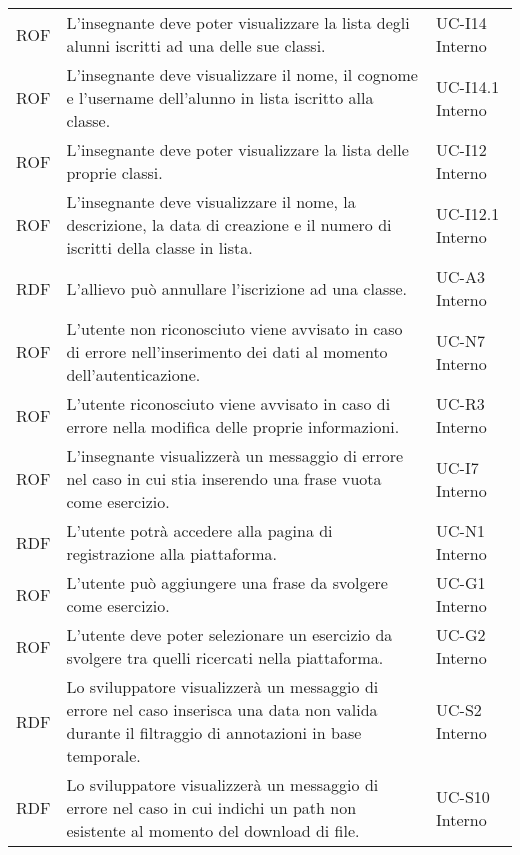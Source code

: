 \begin{tabularx}{\textwidth}{| c | p{10cm} | X |}
		ROF & L'insegnante deve poter visualizzare la lista degli alunni iscritti ad una delle sue classi. & UC-I14 \newline Interno\\
		ROF & L'insegnante deve visualizzare il nome, il cognome e l'username dell'alunno in lista iscritto alla classe. & UC-I14.1 \newline Interno\\
		ROF & L'insegnante deve poter visualizzare la lista delle proprie classi. & UC-I12 \newline Interno\\
		ROF & L'insegnante deve visualizzare il nome, la descrizione, la data di creazione e il numero di iscritti della classe in lista. & UC-I12.1 \newline Interno\\
		RDF & L'allievo può annullare l'iscrizione ad una classe. & UC-A3 \newline Interno\\
		ROF & L'utente non riconosciuto viene avvisato in caso di errore nell'inserimento dei dati al momento dell'autenticazione. & UC-N7 \newline Interno\\
		ROF & L'utente riconosciuto viene avvisato in caso di errore nella modifica delle proprie informazioni. & UC-R3 \newline Interno\\
		ROF & L'insegnante visualizzerà un messaggio di errore nel caso in cui stia inserendo una frase vuota come esercizio. & UC-I7 \newline Interno\\
		RDF & L'utente potrà accedere alla pagina di registrazione alla piattaforma. & UC-N1 \newline Interno\\
		ROF & L'utente può aggiungere una frase da svolgere come esercizio. & UC-G1 \newline Interno\\
		ROF & L'utente deve poter selezionare un esercizio da svolgere tra quelli ricercati nella piattaforma. & UC-G2 \newline Interno\\
		RDF & Lo sviluppatore visualizzerà un messaggio di errore nel caso inserisca una data non valida durante il filtraggio di annotazioni in base temporale. & UC-S2 \newline Interno\\
		RDF & Lo sviluppatore visualizzerà un messaggio di errore nel caso in cui indichi un path non esistente al momento del download di file. & UC-S10 \newline Interno\\

\end{tabularx}
